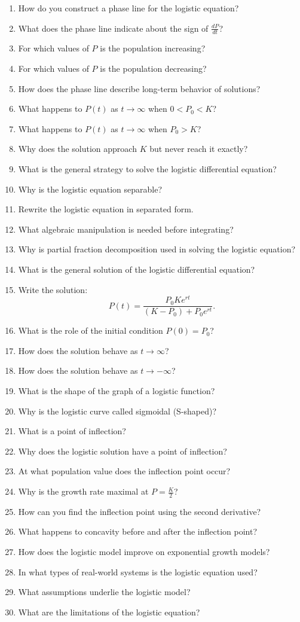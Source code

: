 \begin{enumerate}
  \item How do you construct a phase line for the logistic equation?
  \item What does the phase line indicate about the sign of $\frac{dP}{dt}$?
  \item For which values of $P$ is the population increasing?
  \item For which values of $P$ is the population decreasing?
  \item How does the phase line describe long-term behavior of solutions?
  \item What happens to $P(t)$ as $t \to \infty$ when $0 < P_0 < K$?
  \item What happens to $P(t)$ as $t \to \infty$ when $P_0 > K$?
  \item Why does the solution approach $K$ but never reach it exactly?
  \item What is the general strategy to solve the logistic differential equation?
  \item Why is the logistic equation separable?
  \item Rewrite the logistic equation in separated form.
  \item What algebraic manipulation is needed before integrating?
  \item Why is partial fraction decomposition used in solving the logistic equation?
  \item What is the general solution of the logistic differential equation?
  \item Write the solution:
    \[
      P(t)=\frac{P_0 K e^{rt}}{(K-P_0)+P_0 e^{rt}}.
    \]
  \item What is the role of the initial condition $P(0)=P_0$?
  \item How does the solution behave as $t \to \infty$?
  \item How does the solution behave as $t \to -\infty$?
  \item What is the shape of the graph of a logistic function?
  \item Why is the logistic curve called sigmoidal (S-shaped)?
  \item What is a point of inflection?
  \item Why does the logistic solution have a point of inflection?
  \item At what population value does the inflection point occur?
  \item Why is the growth rate maximal at $P = \frac{K}{2}$?
  \item How can you find the inflection point using the second derivative?
  \item What happens to concavity before and after the inflection point?
  \item How does the logistic model improve on exponential growth models?
  \item In what types of real-world systems is the logistic equation used?
  \item What assumptions underlie the logistic model?
  \item What are the limitations of the logistic equation?
\end{enumerate}
